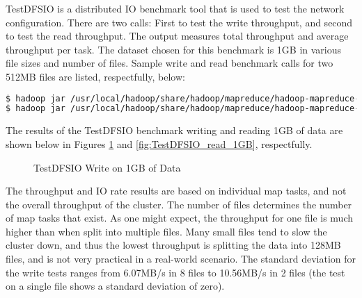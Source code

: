 \documentclass[10pt,journal,compsoc,float]{IEEEtran}
\begin{document}
TestDFSIO is a distributed IO benchmark tool that is used to test the network configuration. There are two calls: First to test the write throughput, and second to test the read throughput. The output measures total throughput and average throughput per task. The dataset chosen for this benchmark is 1GB in various file sizes and number of files. Sample write and read benchmark calls for two 512MB files are listed, respectfully, below:

\begin{lstlisting}[language=bash, deletekeywords={local, read}, otherkeywords={$}]
$ hadoop jar /usr/local/hadoop/share/hadoop/mapreduce/hadoop-mapreduce-client-jobclient-2.7.5-tests.jar TestDFSIO -write -nrFiles 2 -fileSize 512MB
$ hadoop jar /usr/local/hadoop/share/hadoop/mapreduce/hadoop-mapreduce-client-jobclient-2.7.5-tests.jar TestDFSIO -read -nrFiles 2 -fileSize 512MB
\end{lstlisting}

The results of the TestDFSIO benchmark writing and reading 1GB of data are shown below in Figures \ref{fig:TestDFSIO_write_1GB} and \ref{fig:TestDFSIO_read_1GB}, respectfully.

\writedata

\begin{figure}[H]
	\centering
	\caption{TestDFSIO Write on 1GB of Data}
	\label{fig:TestDFSIO_write_1GB}
\end{figure}

The throughput and IO rate results are based on individual map tasks, and not the overall throughput of the cluster. The number of files determines the number of map tasks that exist. As one might expect, the throughput for one file is much higher than when split into multiple files. Many small files tend to slow the cluster down, and thus the lowest throughput is splitting the data into 128MB files, and is not very practical in a real-world scenario. The standard deviation for the write tests ranges from 6.07MB/s in 8 files to 10.56MB/s in 2 files (the test on a single file shows a standard deviation of zero).
\end{document}
